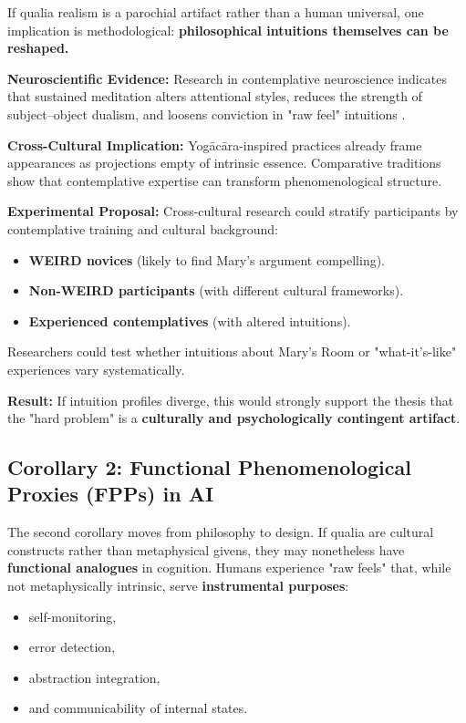 \documentclass[11pt,a4paper]{article}
\begin{document}
If qualia realism is a parochial artifact rather than a human universal, one implication is methodological: \textbf{philosophical intuitions themselves can be reshaped.}

\textbf{Neuroscientific Evidence:} Research in contemplative neuroscience indicates that sustained meditation alters attentional styles, reduces the strength of subject–object dualism, and loosens conviction in "raw feel" intuitions \cite{lutz2007, lindahl2017}.

\textbf{Cross-Cultural Implication:} Yogācāra-inspired practices already frame appearances as projections empty of intrinsic essence. Comparative traditions show that contemplative expertise can transform phenomenological structure.

\textbf{Experimental Proposal:} Cross-cultural research could stratify participants by contemplative training and cultural background:

\begin{itemize}
\item \textbf{WEIRD novices} (likely to find Mary's argument compelling).
\item \textbf{Non-WEIRD participants} (with different cultural frameworks).
\item \textbf{Experienced contemplatives} (with altered intuitions).
\end{itemize}

Researchers could test whether intuitions about Mary's Room or "what-it's-like" experiences vary systematically.

\textbf{Result:} If intuition profiles diverge, this would strongly support the thesis that the "hard problem" is a \textbf{culturally and psychologically contingent artifact}.

\subsection{Corollary 2: Functional Phenomenological Proxies (FPPs) in AI}

The second corollary moves from philosophy to design. If qualia are cultural constructs rather than metaphysical givens, they may nonetheless have \textbf{functional analogues} in cognition. Humans experience "raw feels" that, while not metaphysically intrinsic, serve \textbf{instrumental purposes}:

\begin{itemize}
\item self-monitoring,
\item error detection,
\item abstraction integration,
\item and communicability of internal states.
\end{itemize}
\end{document}
